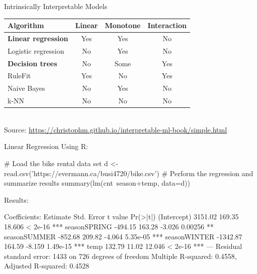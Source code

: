 \documentclass[ignorenonframetext,xcolor=x11names]{beamer}
\begin{document}
\begin{frame}{Intrinsically Interpretable Models}

\centering
\renewcommand{\arraystretch}{1.1}

\begin{tabular}{lccc} \hline
Algorithm & Linear & Monotone & Interaction \\ \hline
\textbf{Linear regression} & Yes & Yes & No  \\ 
Logistic regression & No & Yes & No  \\
\textbf{Decision trees} & No & Some & Yes  \\
RuleFit & Yes & No & Yes  \\
Naive Bayes & No & Yes & No \\
k-NN & No & No & No  \\ \hline
\end{tabular} \\

\scriptsize Source: \url{https://christophm.github.io/interpretable-ml-book/simple.html}\normalsize
\end{frame}

\begin{frame}[fragile]{Linear Regression}
Using R:
\begin{Rcode}
# Load the bike rental data set
d <- read.csv('https://evermann.ca/busi4720/bike.csv')
# Perform the regression and summarize results
summary(lm(cnt~season+temp, data=d))
\end{Rcode}
Results:
\begin{textcode}
Coefficients:
             Estimate Std. Error t value Pr(>|t|)    
(Intercept)   3151.02     169.35  18.606  < 2e-16 ***
seasonSPRING  -494.15     163.28  -3.026  0.00256 ** 
seasonSUMMER  -852.68     209.82  -4.064 5.35e-05 ***
seasonWINTER -1342.87     164.59  -8.159 1.49e-15 ***
temp           132.79      11.02  12.046  < 2e-16 ***
---
Residual standard error: 1433 on 726 degrees of freedom
Multiple R-squared: 0.4558, Adjusted R-squared: 0.4528 
\end{textcode}
\end{frame}
\end{document}
